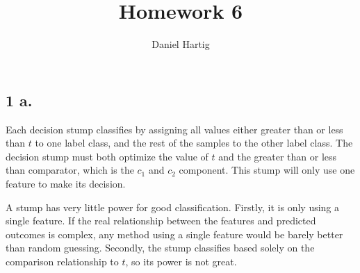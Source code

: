 \documentclass{article}
\title{Homework 6}
\author{Daniel Hartig}
\begin{document}
\maketitle

\subsection*{1 a.}

Each decision stump classifies by assigning all values either greater than or less than $t$ to one label class, and the rest of the samples to the other label class. The decision stump must both optimize the value of $t$ and the greater than or less than comparator, which is the $c_1$ and $c_2$ component. This stump will only use one feature to make its decision.

A stump has very little power for good classification. Firstly, it is only using a single feature. If the real relationship between the features and predicted outcomes is complex, any method using a single feature would be barely better than random guessing. Secondly, the stump classifies based solely on the comparison relationship to $t$, so its power is not great. 
\end{document}
